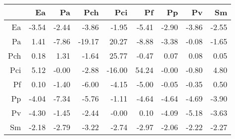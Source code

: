 \begin{table}[ht]
\centering
\begin{tabular}{rrrrrrrrr}
  \hline
 & Ea & Pa & Pch & Pci & Pf & Pp & Pv & Sm \\ 
  \hline
Ea & -3.54 & -2.44 & -3.86 & -1.95 & -5.41 & -2.90 & -3.86 & -2.55 \\ 
  Pa & 1.41 & -7.86 & -19.17 & 20.27 & -8.88 & -3.38 & -0.08 & -1.65 \\ 
  Pch & 0.18 & 1.31 & -1.64 & 25.77 & -0.47 & 0.07 & 0.08 & 0.05 \\ 
  Pci & 5.12 & -0.00 & -2.88 & -16.00 & 54.24 & -0.00 & -0.80 & 4.80 \\ 
  Pf & 0.10 & -1.40 & -6.00 & -4.15 & -5.00 & -0.05 & -0.35 & 0.50 \\ 
  Pp & -4.04 & -7.34 & -5.76 & -1.11 & -4.64 & -4.64 & -4.69 & -3.90 \\ 
  Pv & -4.30 & -1.45 & -2.44 & -0.00 & 0.10 & -4.09 & -5.18 & -3.63 \\ 
  Sm & -2.18 & -2.79 & -3.22 & -2.74 & -2.97 & -2.06 & -2.22 & -2.27 \\ 
   \hline
\end{tabular}
\end{table}
